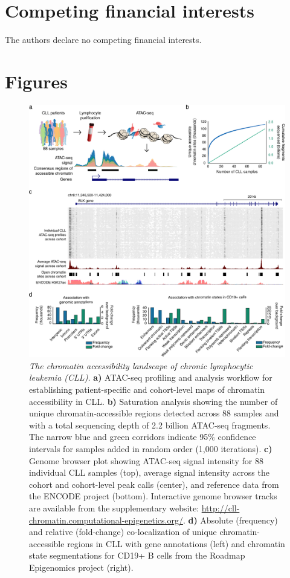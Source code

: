 \documentclass[10pt,]{article}
\begin{document}
\section{Competing financial
interests}\label{competing-financial-interests}

The authors declare no competing financial interests.

\section{Figures}\label{figures}

\begin{figure}
\centering
\includegraphics[width=1.000\hsize]{figures/Figure1.pdf}
\caption{\emph{The chromatin accessibility landscape of chronic
lymphocytic leukemia (CLL).} \textbf{a)} ATAC-seq profiling and analysis
workflow for establishing patient-specific and cohort-level maps of
chromatin accessibility in CLL. \textbf{b)} Saturation analysis showing
the number of unique chromatin-accessible regions detected across 88
samples and with a total sequencing depth of 2.2 billion ATAC-seq
fragments. The narrow blue and green corridors indicate 95\% confidence
intervals for samples added in random order (1,000 iterations).
\textbf{c)} Genome browser plot showing ATAC-seq signal intensity for 88
individual CLL samples (top), average signal intensity across the cohort
and cohort-level peak calls (center), and reference data from the ENCODE
project (bottom). Interactive genome browser tracks are available from
the supplementary website:
\url{http://cll-chromatin.computational-epigenetics.org/}. \textbf{d)}
Absolute (frequency) and relative (fold-change) co-localization of
unique chromatin-accessible regions in CLL with gene annotations (left)
and chromatin state segmentations for CD19+ B cells from the Roadmap
Epigenomics project (right).}\label{Figure1}
\end{figure}
\end{document}
